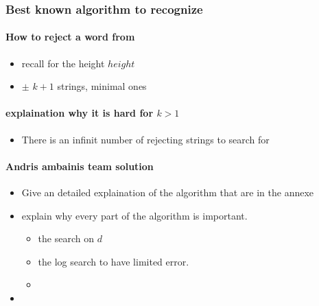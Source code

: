 \subsubsection{Best known algorithm to recognize }

\paragraph*{\textbf{How to reject a word from }}
\begin{itemize}
    \item recall for the height $height$
    \item $\pm$ $k+1$ strings, minimal ones
\end{itemize}

\paragraph*{\textbf{explaination why it is hard for $k > 1$}}
\begin{itemize}
    \item There is an infinit number of rejecting strings to search for
\end{itemize}

\paragraph*{\textbf{Andris ambainis team solution}}
\begin{itemize}
    \item Give an detailed explaination of the algorithm that are in the annexe
    \item explain why every part of the algorithm is important.
          \begin{itemize}
              \item the search on $d$
              \item the log search to have limited error.
              \item {}
          \end{itemize}
    \item
\end{itemize}